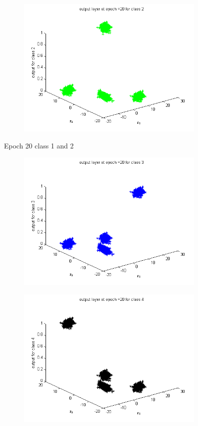 \documentclass{article}
\begin{document}
\begin{flushleft}
\begin{figure}
\begin{subfigure}{.5\textwidth}
\end{subfigure}%
\begin{subfigure}{.5\textwidth}
  \centering
  \includegraphics[width=.8\linewidth]{Classification/linearlySeparable/20_2}
  
\end{subfigure}
\caption{Epoch 20 class 1 and 2}
\end{figure}

\begin{figure}
\begin{subfigure}{.5\textwidth}
  \centering
  \includegraphics[width=.8\linewidth]{Classification/linearlySeparable/20_3}
 
\end{subfigure}%
\begin{subfigure}{.5\textwidth}
  \centering
  \includegraphics[width=.8\linewidth]{Classification/linearlySeparable/20_4}
  

\end{subfigure}
\end{figure}
\end{flushleft}
\end{document}
